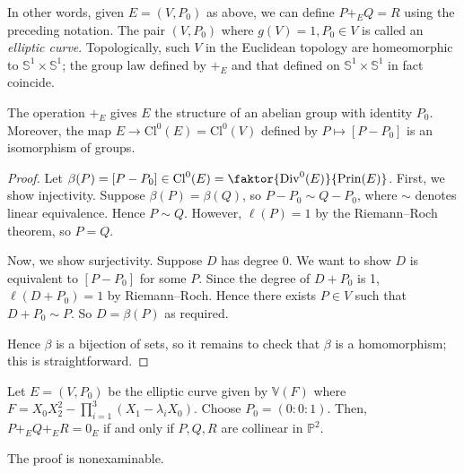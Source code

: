 In other words, given \( E = (V, P_0) \) as above, we can define \( P +_E Q = R \) using the preceding notation.
The pair \( (V,P_0) \) where \( g(V) = 1, P_0 \in V \) is called an \emph{elliptic curve}.
Topologically, such \( V \) in the Euclidean topology are homeomorphic to \( \mathbb S^1 \times \mathbb S^1 \); the group law defined by \( +_E \) and that defined on \( \mathbb S^1 \times \mathbb S^1 \) in fact coincide.
\begin{theorem}
    The operation \( +_E \) gives \( E \) the structure of an abelian group with identity \( P_0 \).
    Moreover, the map \( E \to \mathrm{Cl}^0(E) = \mathrm{Cl}^0(V) \) defined by \( P \mapsto [P - P_0] \) is an isomorphism of groups.
\end{theorem}
\begin{proof}
    Let \( \beta(P) = [P - P_0] \in \mathrm{Cl}^0(E) = \faktor{\mathrm{Div}^0(E)}{\mathrm{Prin}(E)} \).
    First, we show injectivity.
    Suppose \( \beta(P) = \beta(Q) \), so \( P - P_0 \sim Q - P_0 \), where \( \sim \) denotes linear equivalence.
    Hence \( P \sim Q \).
    However, \( \ell(P) = 1 \) by the Riemann--Roch theorem, so \( P = Q \).

    Now, we show surjectivity.
    Suppose \( D \) has degree 0.
    We want to show \( D \) is equivalent to \( [P - P_0] \) for some \( P \).
    Since the degree of \( D + P_0 \) is 1, \( \ell(D + P_0) = 1 \) by Riemann--Roch.
    Hence there exists \( P \in V \) such that \( D + P_0 \sim P \).
    So \( D = \beta(P) \) as required.

    Hence \( \beta \) is a bijection of sets, so it remains to check that \( \beta \) is a homomorphism; this is straightforward.
\end{proof}
\begin{theorem}
    Let \( E = (V, P_0) \) be the elliptic curve given by \( \mathbb V(F) \) where \( F = X_0 X_2^2 - \prod_{i=1}^3 (X_1 - \lambda_i X_0) \).
    Choose \( P_0 = (0 : 0 : 1) \).
    Then, \( P +_E Q +_E R = 0_E \) if and only if \( P, Q, R \) are collinear in \( \mathbb P^2 \).
\end{theorem}
The proof is nonexaminable.

